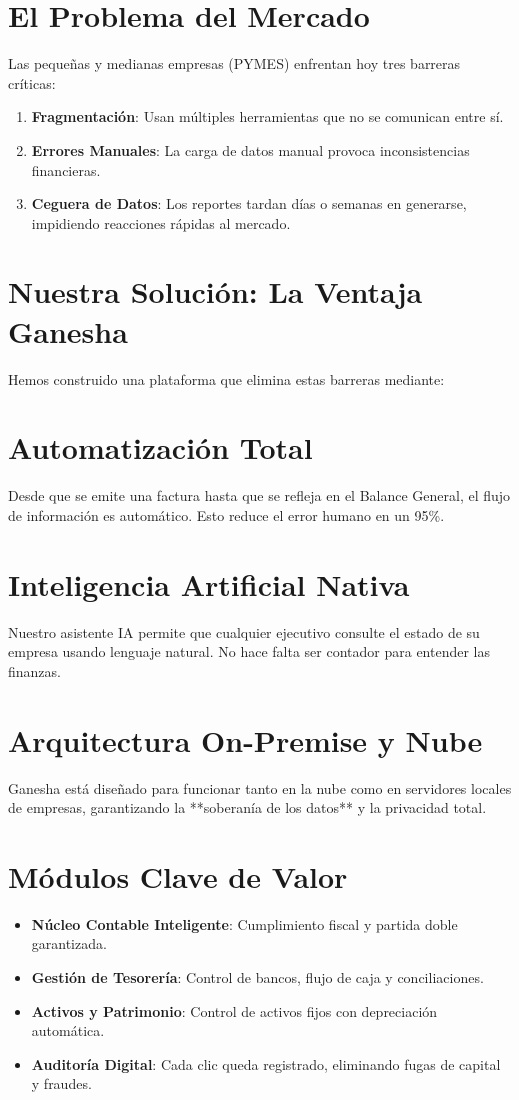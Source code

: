 \documentclass[12pt, a4paper, oneside]{book}
\begin{document}
\chapter{El Problema del Mercado}
Las pequeñas y medianas empresas (PYMES) enfrentan hoy tres barreras críticas:
\begin{enumerate}
    \item \textbf{Fragmentación}: Usan múltiples herramientas que no se comunican entre sí.
    \item \textbf{Errores Manuales}: La carga de datos manual provoca inconsistencias financieras.
    \item \textbf{Ceguera de Datos}: Los reportes tardan días o semanas en generarse, impidiendo reacciones rápidas al mercado.
\end{enumerate}

\chapter{Nuestra Solución: La Ventaja Ganesha}
Hemos construido una plataforma que elimina estas barreras mediante:
\chapter{Automatización Total}
Desde que se emite una factura hasta que se refleja en el Balance General, el flujo de información es automático. Esto reduce el error humano en un 95\%.

\chapter{Inteligencia Artificial Nativa}
Nuestro asistente IA permite que cualquier ejecutivo consulte el estado de su empresa usando lenguaje natural. No hace falta ser contador para entender las finanzas.

\chapter{Arquitectura On-Premise y Nube}
Ganesha está diseñado para funcionar tanto en la nube como en servidores locales de empresas, garantizando la **soberanía de los datos** y la privacidad total.

\chapter{Módulos Clave de Valor}
\begin{itemize}
    \item \textbf{Núcleo Contable Inteligente}: Cumplimiento fiscal y partida doble garantizada.
    \item \textbf{Gestión de Tesorería}: Control de bancos, flujo de caja y conciliaciones.
    \item \textbf{Activos y Patrimonio}: Control de activos fijos con depreciación automática.
    \item \textbf{Auditoría Digital}: Cada clic queda registrado, eliminando fugas de capital y fraudes.
\end{itemize}
\end{document}
